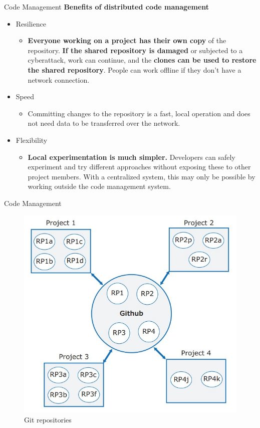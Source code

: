 \documentclass{beamer}
\begin{document}
\begin{frame}{Code Management}
	\textbf{Benefits of distributed code management}
	\begin{itemize}
		\item Resilience
		\begin{itemize}
			\item \textbf{Everyone working on a project has their own copy} of the repository. \textbf{If the shared repository is damaged }or subjected to a cyberattack, work can continue, and the \textbf{clones can be used to restore the shared repository}. People can work offline if they don’t have a network connection.
		\end{itemize}
		\item Speed
			\begin{itemize}
			\item Committing changes to the repository is a fast, local operation and does not need data to be transferred over the network. 
		\end{itemize}
		\item Flexibility
			\begin{itemize}
			\item \textbf{Local experimentation is much simpler.} Developers can safely experiment and try different approaches without exposing these to other project members. With a centralized system, this may only be possible by working outside the code management system.
		\end{itemize}
		
		
	\end{itemize}
\end{frame}
\begin{frame}{Code Management}
	\begin{figure}
		\includegraphics[scale=.4]{img/m3_40}
		\caption{Git repositories}
	\end{figure}
\end{frame}
\end{document}
